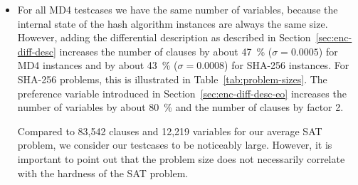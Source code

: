 \begin{itemize}
  \item For all MD4 testcases we have the same number of variables,
    because the internal state of the hash algorithm instances are
    always the same size.
    However, adding the differential description as described in
    Section~\ref{sec:enc-diff-desc} increases the number of clauses
    by about 47~\% ($\sigma = 0.0005$) for MD4 instances and
    by about 43~\% ($\sigma = 0.0008$) for SHA-256 instances.
    For SHA-256 problems, this is illustrated in Table~\ref{tab:problem-sizes}.
    The preference variable introduced in Section~\ref{sec:enc-diff-desc-eo}
    increases the number of variables by about 80~\%
    and the number of clauses by factor 2.


    Compared to 83,542 clauses and 12,219 variables for our average SAT problem,
    we consider our testcases to be noticeably large. However, it is important to
    point out that the problem size does not necessarily correlate with
    the hardness of the SAT problem.


\end{itemize}
